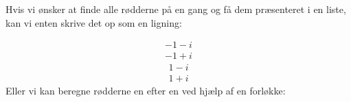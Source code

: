 \documentclass[letterpaper,10pt,english]{jupyterBook}
\begin{document}
Hvis vi ønsker at finde alle rødderne på en gang og få dem præsenteret i en liste, kan vi enten skrive det op som en ligning:

\begin{sphinxVerbatim}[commandchars=\\\{\}]
   
  
\end{sphinxVerbatim}
\begin{equation*}
\begin{split}\displaystyle -1 - i\end{split}
\end{equation*}\begin{equation*}
\begin{split}\displaystyle -1 + i\end{split}
\end{equation*}\begin{equation*}
\begin{split}\displaystyle 1 - i\end{split}
\end{equation*}\begin{equation*}
\begin{split}\displaystyle 1 + i\end{split}
\end{equation*}
Eller vi kan beregne rødderne en efter en ved hjælp af en for\sphinxhyphen{}løkke:
\end{document}
